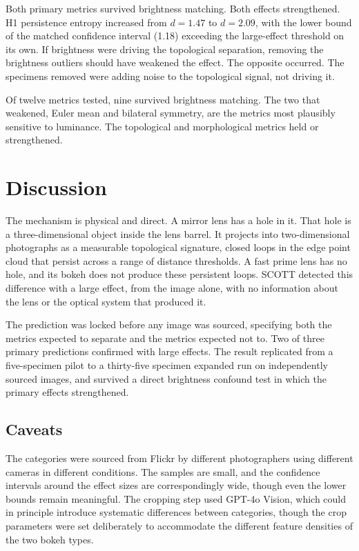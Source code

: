\documentclass[11pt,a4paper]{article}
\begin{document}
Both primary metrics survived brightness matching. Both effects strengthened. H1 persistence entropy increased from $d=1.47$ to $d=2.09$, with the lower bound of the matched confidence interval (1.18) exceeding the large-effect threshold on its own. If brightness were driving the topological separation, removing the brightness outliers should have weakened the effect. The opposite occurred. The specimens removed were adding noise to the topological signal, not driving it.

Of twelve metrics tested, nine survived brightness matching. The two that weakened, Euler mean and bilateral symmetry, are the metrics most plausibly sensitive to luminance. The topological and morphological metrics held or strengthened.

\section{Discussion}

The mechanism is physical and direct. A mirror lens has a hole in it. That hole is a three-dimensional object inside the lens barrel. It projects into two-dimensional photographs as a measurable topological signature, closed loops in the edge point cloud that persist across a range of distance thresholds. A fast prime lens has no hole, and its bokeh does not produce these persistent loops. SCOTT detected this difference with a large effect, from the image alone, with no information about the lens or the optical system that produced it.

The prediction was locked before any image was sourced, specifying both the metrics expected to separate and the metrics expected not to. Two of three primary predictions confirmed with large effects. The result replicated from a five-specimen pilot to a thirty-five specimen expanded run on independently sourced images, and survived a direct brightness confound test in which the primary effects strengthened.

\subsection{Caveats}

The categories were sourced from Flickr by different photographers using different cameras in different conditions. The samples are small, and the confidence intervals around the effect sizes are correspondingly wide, though even the lower bounds remain meaningful. The cropping step used GPT-4o Vision, which could in principle introduce systematic differences between categories, though the crop parameters were set deliberately to accommodate the different feature densities of the two bokeh types.
\end{document}
